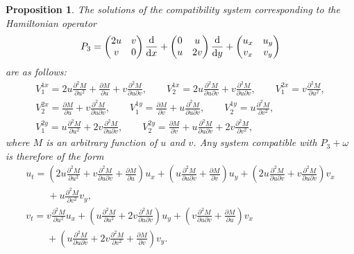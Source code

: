 \documentclass[pdftex]{sigma}
\numberwithin{equation}{section}
\newtheorem{Proposition}[Theorem]{Proposition}
 { \theoremstyle{definition}
\newtheorem{Definition}[Theorem]{Definition}
\newtheorem{Note}[Theorem]{Note}
\newtheorem{Example}[Theorem]{Example}
\newtheorem{Remark}[Theorem]{Remark} }
\begin{document}
\begin{Proposition}\label{proposition4.4}
The solutions of the compatibility system corresponding to the Hamiltonian operator
\begin{gather*}
P_3=\begin{pmatrix} 2u&v\\v&0\\ \end{pmatrix} \frac{\rm d}{{\rm d}x}+\begin{pmatrix} 0&u\\u&2v\\ \end{pmatrix} \frac{\rm d}{{\rm d}y}+\begin{pmatrix} u_x&u_y\\v_x&v_y\\ \end{pmatrix}
\end{gather*}
are as follows:
\begin{gather*}
 V^{1x}_1=2u\frac{\partial^2M}{\partial u^2}+\frac{\partial M}{\partial u}+v\frac{\partial^2M}{\partial u \partial v}, \qquad V^{1x}_2=2u\frac{\partial^2M}{\partial u \partial v}+v\frac{\partial^2M}{\partial u \partial v},\qquad
 V^{2x}_1=v\frac{\partial^2M}{\partial u^2}, \\ V^{2x}_2=\frac{\partial M}{\partial u}+v\frac{\partial^2M}{\partial u \partial v}, \qquad
 V^{1y}_1=\frac{\partial M}{\partial v}+u\frac{\partial^2M}{\partial u \partial v}, \qquad V^{1y}_2=u\frac{\partial^2M}{\partial v^2}, \\
 V^{2y}_1=u\frac{\partial^2M}{\partial u^2}+2v\frac{\partial^2M}{\partial u \partial v} ,
 \qquad V^{2y}_2=\frac{\partial M}{\partial v}+u\frac{\partial^2M}{\partial u\partial v}+2v\frac{\partial^2M}{\partial v^2},
\end{gather*}
where $M$ is an arbitrary function of $u$ and $v$. Any system compatible with $P_3+\omega$ is therefore of the form
\begin{gather*}
u_t=\left(2u\frac{\partial^2 M}{\partial u^2}+v\frac{\partial^2 M}{\partial u\partial v}+\frac{\partial M}{\partial u}\right)u_x+\left(u\frac{\partial^2 M}{\partial u\partial v}+\frac{\partial M}{\partial v}\right) u_y+\left(2u\frac{\partial^2 M}{\partial u\partial v}+v\frac{\partial^2M}{\partial u\partial v}\right)v_x\\
\phantom{u_t=}{}+
u\frac{\partial^2 M}{\partial v^2}v_y,\\
v_t=v\frac{\partial^2 M}{\partial u^2}u_x+\left(u\frac{\partial^2 M}{\partial u^2}+2v\frac{\partial^2 M}{\partial u\partial v}\right) u_y+\left(v\frac{\partial^2 M}{\partial u\partial v}+\frac{\partial M}{\partial u}\right)v_x\\
\phantom{v_t=}{}
+\left(u\frac{\partial^2 M}{\partial u\partial v}+2v\frac{\partial^2 M}{\partial v^2}+\frac{\partial M}{\partial v}\right)v_y.
\end{gather*}
\end{Proposition}
\end{document}
